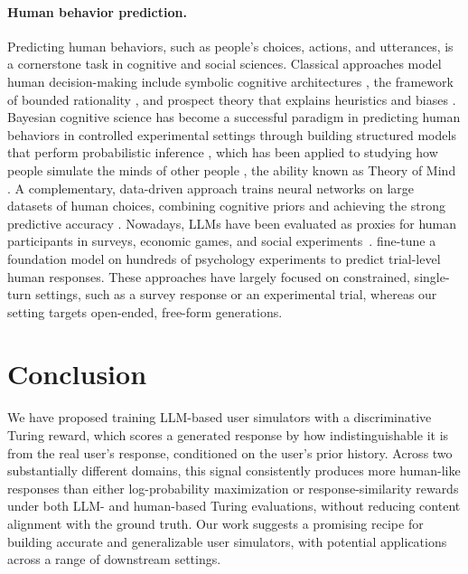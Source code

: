 \documentclass[11pt]{article}
\begin{document}
\paragraph{Human behavior prediction.} Predicting human behaviors, such as people's choices, actions, and utterances, is a cornerstone task in cognitive and social sciences. Classical approaches model human decision-making include symbolic cognitive architectures \citep{newell1994unified, anderson2013adaptive}, the framework of bounded rationality \citep{simon1955behavioral}, and prospect theory that explains heuristics and biases \citep{kahneman2013prospect}. Bayesian cognitive science has become a successful paradigm in predicting human behaviors in controlled experimental settings through building structured models that perform probabilistic inference \citep{griffiths2024bayesian}, which has been applied to studying how people simulate the minds of other people \citep{baker2009action, baker2017rational}, the ability known as Theory of Mind \citep{frith2005theory}.
A complementary, data-driven approach trains neural networks on large datasets of human choices, combining cognitive priors and achieving the strong predictive accuracy \citep{bourgin2019cognitive, peterson2021using}. Nowadays, LLMs have been evaluated as proxies for human participants in surveys, economic games, and social experiments~\citep{argyle2023out, horton2023large, aher2023using, park2024generative}. \citet{binz2025foundation} fine-tune a foundation model on hundreds of psychology experiments to predict trial-level human responses. These approaches have largely focused on constrained, single-turn settings, such as a survey response or an experimental trial, whereas our setting targets open-ended, free-form generations. 

\section{Conclusion}

We have proposed training LLM-based user simulators with a discriminative Turing reward, which scores a generated response by how indistinguishable it is from the real user's response, conditioned on the user's prior history. Across two substantially different domains, this signal consistently produces more human-like responses than either log-probability maximization or response-similarity rewards under both LLM- and human-based Turing evaluations, without reducing content alignment with the ground truth. 
Our work suggests a promising recipe for building accurate and generalizable user simulators, with potential applications across a range of downstream settings. 
\end{document}
